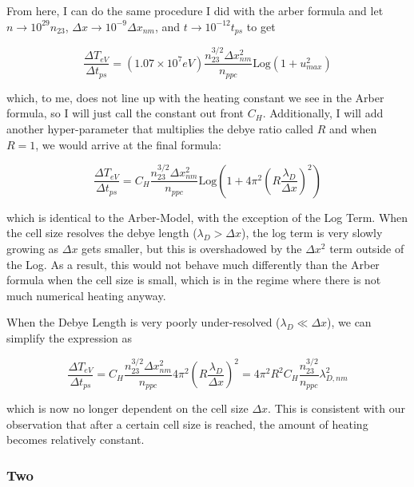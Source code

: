 From here, I can do the same procedure I did with the arber formula and let $n \rightarrow 10^{29} n_{23}$, $\Delta x \rightarrow 10^{-9} \Delta x_{nm}$, and $t \rightarrow 10^{-12} t_{ps}$ to get 

\begin{equation}
	\frac{\Delta T_{eV}}{\Delta t_{ps}} = (1.07 \times 10^7 eV) \frac{n_{23}^{3/2} \Delta x_{nm}^2}{n_{ppc}} \text{Log}(1 + u_{max}^2)
\end{equation}

which, to me, does not line up with the heating constant we see in the Arber formula, so I will just call the constant out front $C_H$. Additionally, I will add another hyper-parameter that multiplies the debye ratio called $R$ and when $R=1$, we would arrive at the final formula:

\begin{equation}
	\frac{\Delta T_{eV}}{\Delta t_{ps}} = C_H \frac{n_{23}^{3/2} \Delta x_{nm}^2}{n_{ppc}} \text{Log}(1 + 4 \pi^2 (R \frac{\lambda_D}{\Delta x})^2)
\end{equation}

which is identical to the Arber-Model, with the exception of the Log Term. When the cell size resolves the debye length ($\lambda_D > \Delta x$), the log term is very slowly growing as $\Delta x$ gets smaller, but this is overshadowed by the $\Delta x^2$ term outside of the Log. As a result, this would not behave much differently than the Arber formula when the cell size is small, which is in the regime where there is not much numerical heating anyway. 

When the Debye Length is very poorly under-resolved ($\lambda_D \ll \Delta x$), we can simplify the expression as 

\begin{equation}
	\frac{\Delta T_{eV}}{\Delta t_{ps}} = C_H \frac{n_{23}^{3/2} \Delta x_{nm}^2}{n_{ppc}} 4 \pi^2 (R \frac{\lambda_D}{\Delta x})^2 = 4 \pi^2 R^2 C_H \frac{n_{23}^{3/2}}{n_{ppc}} \lambda_{D, nm}^2
\end{equation}

which is now no longer dependent on the cell size $\Delta x$. This is consistent with our observation that after a certain cell size is reached, the amount of heating becomes relatively constant.

\subsubsection{Two}

